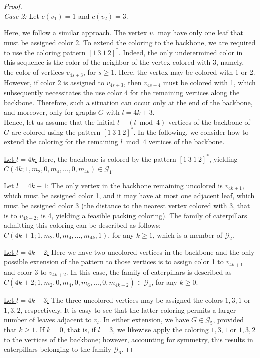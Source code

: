 \documentclass[10pt,a4paper]{amsart}
\begin{document}
\begin{proof}
~~\\
\emph{Case 2:} Let $c(v_1)=1$ and  $c(v_2)=3$.

Here, we follow a similar approach. The vertex $v_1$ may have only one leaf that must be assigned color 2. To extend the coloring to the backbone, we are required to use the coloring pattern $[1\ 3\ 1\  2]^*$. Indeed, the only undetermined color in this sequence is the color of the neighbor of the vertex colored with 3, namely, the color of vertices $v_{4s+3}$, for $s\geq 1$. Here, the vertex may be colored with 1 or 2. However, if color 2 is assigned to $v_{4s+3}$, then $v_{4s+4}$ must be colored with 1, which subsequently necessitates the use color 4 for the remaining vertices along the backbone. Therefore, such a situation can occur only at the end of the backbone, and moreover, only for graphs $G$ with $l=4k+3$.
\\Hence, let us assume that the initial $l - (l \bmod 4)$  vertices of the backbone of $G$ are colored using the pattern $[1\ 3\ 1\ 2]^*$. In the following, we consider how to extend the coloring for the remaining $l \bmod 4$ vertices of the backbone.

\underline{Let $l=4k$:} Here, the backbone is colored by the pattern $[1\ 3\ 1\ 2]^*$, yielding $C(4k;1,m_2,0,m_4,\ldots, 0, m_{4k}) \in \mathcal{G}_{1}$.

\underline{Let $l=4k+1$:} The only vertex  in the backbone remaining uncolored is $v_{4k+1}$, which must be assigned color 1, and it may have at most one adjacent leaf, which must be assigned color 3 (the distance to the nearest vertex colored with 3, that is to $v_{4k-2}$, is 4, yielding a feasible packing coloring). The family of caterpillars admitting this coloring can be described as follows: $C(4k+1; 1, m_2, 0, m_4, \ldots, m_{4k}, 1)$, for any $k\geq 1$, which is a member of $\mathcal{G}_2$.

\underline{Let $l=4k+2$:} Here we have two uncolored vertices in the backbone and the only possible extension of the pattern to those vertices is to assign color 1 to $v_{4k+1}$ and color 3 to $v_{4k+2}$. In this case, the family of caterpillars is described as $C(4k+2;1,m_2,0,m_4,0,m_6, \ldots,0,m_{4k+2}) \in  \mathcal{G}_4$, for any $k\geq 0$.

\underline{Let $l=4k+3$:} The three uncolored vertices may be assigned the colors $1, 3, 1$ or $1,3, 2$, respectively. It is easy to see that the latter coloring permits a larger number of leaves adjacent to $v_l$. In either extension, we have $G\in \mathcal{G}_5$, provided that $k\geq 1$.  If $k=0$, that is, if $l=3$, we likewise apply the coloring  $1, 3, 1$ or $1,3, 2$ to the vertices of the backbone; however, accounting for symmetry, this results in caterpillars belonging to the family $\mathcal{G}_6$.


\end{proof}
\end{document}
